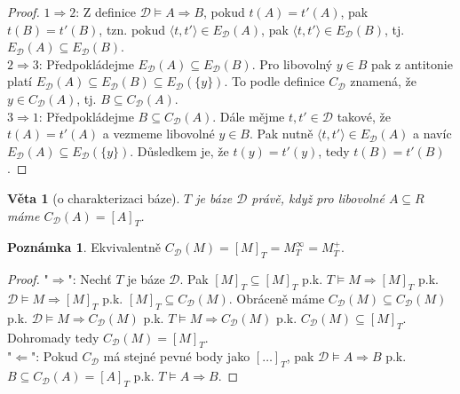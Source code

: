 \documentclass{article}
\newtheorem{theorem}{Věta}
\theoremstyle {definition}
\newtheorem*{remark}{Poznámka}
\begin{document}
\begin{proof}
  $1\Rightarrow2$: Z definice $\mathcal{D} \models A \Rightarrow B$,
  pokud $t(A)=t'(A)$, pak $t(B)=t'(B)$, tzn. pokud $\langle t, t'
  \rangle \in E_{\mathcal{D}}(A)$, pak $\langle t, t' \rangle \in
  E_{\mathcal{D}}(B)$, tj. $E_{\mathcal{D}}(A) \subseteq
  E_{\mathcal{D}}(B)$.\\

  $2\Rightarrow3$: Předpokládejme $E_{\mathcal{D}}(A) \subseteq
  E_{\mathcal{D}}(B)$. Pro libovolný $y \in B$ pak z antitonie platí
  $E_{\mathcal{D}}(A) \subseteq E_{\mathcal{D}}(B) \subseteq
  E_{\mathcal{D}}(\{y\})$. To podle definice $C_{\mathcal{D}}$
  znamená, že $y \in C_{\mathcal{D}}(A)$, tj. $B \subseteq
  C_{\mathcal{D}}(A)$.\\

  $3\Rightarrow1$: Předpokládejme $B \subseteq C_{\mathcal{D}}(A)$.
  Dále mějme $t, t'\in \mathcal D$ takové, že $t(A)=t'(A)$ a vezmeme
  libovolné $y \in B$. Pak nutně $\langle t, t' \rangle \in
  E_{\mathcal{D}}(A)$ a navíc $E_{\mathcal{D}}(A) \subseteq
  E_{\mathcal{D}}(\{y\})$. Důsledkem je, že $t(y)=t'(y)$, tedy
  $t(B)=t'(B)$.
\end{proof}

\begin{theorem}[o charakterizaci báze]
  $T$ je báze $\mathcal{D}$ právě, když pro libovolné $A\subseteq R$
  máme $C_{\mathcal{D}}(A)=[A]_T$.
\end{theorem}

\begin{remark}
  Ekvivalentně $C_{\mathcal{D}}(M)=[M]_T = M^{\infty}_T = M^{+}_T$.
\end{remark}

\begin{proof}
  "$\Rightarrow$": Nechť $T$ je báze $\mathcal{D}$. Pak $[M]_T
  \subseteq [M]_T$ p.k. $T \models M \Rightarrow [M]_T$
  p.k. $\mathcal{D} \models M \Rightarrow [M]_T$ p.k. $[M]_T \subseteq
  C_{\mathcal{D}}(M)$. Obráceně máme $C_{\mathcal{D}}(M) \subseteq
  C_{\mathcal{D}}(M)$ p.k. $\mathcal{D} \models M \Rightarrow
  C_{\mathcal{D}}(M)$ p.k. $T \models M \Rightarrow
  C_{\mathcal{D}}(M)$ p.k. $C_{\mathcal{D}}(M) \subseteq [M]_T$.
  Dohromady tedy $C_{\mathcal{D}}(M) =[M]_T$. \\
  
  "$\Leftarrow$": Pokud $C_{\mathcal{D}}$ má stejné pevné body jako
  $[\dots]_T$, pak $\mathcal{D} \models A \Rightarrow B$ p.k. $B
  \subseteq C_{\mathcal{D}}(A) = [A]_T$ p.k. $T \models A \Rightarrow
  B$.
\end{proof}
\end{document}
